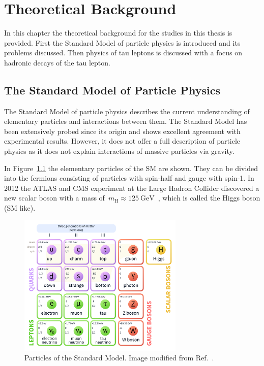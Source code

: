 \chapter{Theoretical Background}
\label{sec:theory}

In this chapter the theoretical background for the studies in this thesis is
provided. First the Standard Model of particle physics is introduced and its
problems discussed. Then physics of tau leptons is discussed with a focus on
hadronic decays of the tau lepton.

\section{The Standard Model of Particle Physics}

The Standard Model of particle physics describes the current understanding of
elementary particles and interactions between them. The Standard Model has been
extensively probed since its origin and shows excellent agreement with
experimental results. However, it does not offer a full description of particle
physics as it does not explain interactions of massive particles via gravity.

In Figure~\ref{fig:sm_particles} the elementary particles of the SM are shown.
They can be divided into the fermions consisting of particles with spin-half and
gauge with spin-1. In 2012 the ATLAS and CMS experiment at the Large Hadron
Collider discovered a new scalar boson with a mass
of~$m_\text{H} \approx \SI{125}{\GeV}$~\cite{higgs_atlas, higgs_cms}, which is
called the Higgs boson (SM like).

\begin{figure}[htb]
  \centering
  \includegraphics[width=0.7\textwidth]{./figures/theory/sm_particles.pdf}
  \caption{Particles of the Standard Model. Image modified from
    Ref.~\cite{sm_wiki}.}
  \label{fig:sm_particles}
\end{figure}

